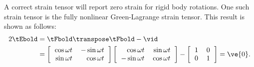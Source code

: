A correct strain tensor will report zero strain for rigid body
rotations.  One such strain tensor is the fully nonlinear 
Green-Lagrange
strain tensor.  This result is shown as follows:
\begin{align}
 2 \tEbold &= \tFbold\transpose\tFbold - \vid \\
 &= 
 \left[
 \begin{tabular}{rr}
 $\cos \omega t$ & $-\sin \omega t$ \\
 $\sin \omega t$ & $\cos \omega t$ 
 \end{tabular}
 \right]
 \left[
 \begin{tabular}{rr}
 $\cos \omega t$ & $\sin \omega t$ \\
 $-\sin \omega t$ & $\cos \omega t$ 
 \end{tabular}
 \right]
 -   
 \left[
 \begin{tabular}{rr}
 $1$ & $0$ \\
 $0$ & $1$ 
 \end{tabular}
 \right] = \ve{0}. 
\end{align}


